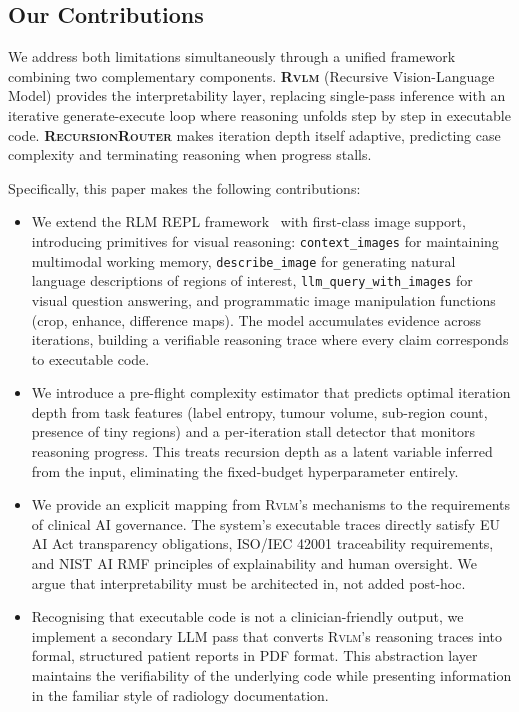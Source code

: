 \documentclass{article}
\newcommand{\RVLM}{\textsc{Rvlm}}
\newcommand{\RRouter}{\textsc{RecursionRouter}}
\begin{document}
	\subsection{Our Contributions}
	
	We address both limitations simultaneously through a unified framework combining two complementary components. \textbf{\RVLM{}} (Recursive Vision-Language Model) provides the interpretability layer, replacing single-pass inference with an iterative generate-execute loop where reasoning unfolds step by step in executable code. \textbf{\RRouter{}} makes iteration depth itself adaptive, predicting case complexity and terminating reasoning when progress stalls.
	
	Specifically, this paper makes the following contributions:
	
	\begin{itemize}[leftmargin=*,itemsep=4pt]
		\item We extend the RLM REPL framework~\citep{zhang2025rlm} with first-class image support, introducing primitives for visual reasoning: \texttt{context\_images} for maintaining multimodal working memory, \texttt{describe\_image} for generating natural language descriptions of regions of interest, \texttt{llm\_query\_with\_images} for visual question answering, and programmatic image manipulation functions (crop, enhance, difference maps). The model accumulates evidence across iterations, building a verifiable reasoning trace where every claim corresponds to executable code.
		
		\item We introduce a pre-flight complexity estimator that predicts optimal iteration depth from task features (label entropy, tumour volume, sub-region count, presence of tiny regions) and a per-iteration stall detector that monitors reasoning progress. This treats recursion depth as a latent variable inferred from the input, eliminating the fixed-budget hyperparameter entirely.
		
		\item We provide an explicit mapping from \RVLM{}'s mechanisms to the requirements of clinical AI governance. The system's executable traces directly satisfy EU AI Act transparency obligations, ISO/IEC 42001 traceability requirements, and NIST AI RMF principles of explainability and human oversight. We argue that interpretability must be architected in, not added post-hoc.
		
		\item Recognising that executable code is not a clinician-friendly output, we implement a secondary LLM pass that converts \RVLM{}'s reasoning traces into formal, structured patient reports in PDF format. This abstraction layer maintains the verifiability of the underlying code while presenting information in the familiar style of radiology documentation.
		

\end{itemize}
\end{document}
